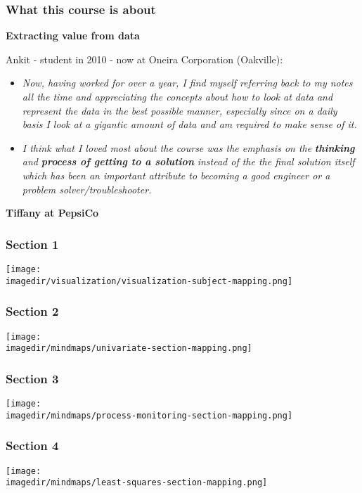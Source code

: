 \begin{frame}\frametitle{What this course is about}
	
	\textbf{Extracting value from data}
	
	Ankit - student in 2010 - now at Oneira Corporation (Oakville):
	\begin{itemize}
		\item	\emph{Now, having worked for over a year, I find myself referring back to my notes all the time and appreciating the concepts about how to look at data and represent the data in the best possible manner, especially since on a daily basis I look at a gigantic amount of data and am required to make sense of it.} 
	\end{itemize}
	\begin{itemize}
		\item	\emph{I think what I loved most about the course was the emphasis on the} \textbf{\emph{thinking}} \emph{and} \textbf{\emph{process of getting to a solution}} \emph{instead of the the final solution itself which has been an important attribute to becoming a good engineer or a problem solver/troubleshooter.} 
	\end{itemize}
	
	\vspace{12pt}
	\textbf{Tiffany at PepsiCo}
\end{frame}

\begin{frame}\frametitle{Section 1}
	\texttt{[image: \\imagedir/visualization/visualization-subject-mapping.png]}
\end{frame}

\begin{frame}\frametitle{Section 2}
	
	\texttt{[image: \\imagedir/mindmaps/univariate-section-mapping.png]}
\end{frame}

\begin{frame}\frametitle{Section 3}
	
	\texttt{[image: \\imagedir/mindmaps/process-monitoring-section-mapping.png]}
\end{frame}

\begin{frame}\frametitle{Section 4}
	
	\texttt{[image: \\imagedir/mindmaps/least-squares-section-mapping.png]}
\end{frame}

